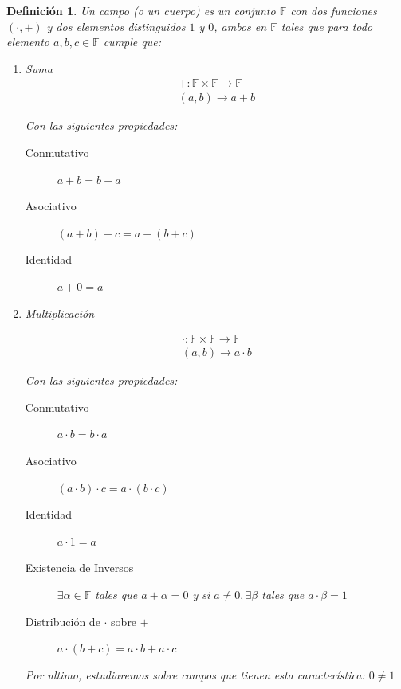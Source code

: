 \documentclass[10pt,a4paper]{article}
\newtheorem{mydef}{Definición}
\begin{document}
\begin{mydef} 
Un \textit{campo} (o un cuerpo) es un conjunto $ \mathbb{F} $ con dos funciones $ ( \cdot , + )$ y dos elementos distinguidos $ 1 $ y $ 0 $, ambos en $ \mathbb{F} $ tales que para todo elemento $a,b,c \in \mathbb{F}$ cumple que:

\begin{enumerate}
\item Suma
\begin{align*}
+:\mathbb{F} \times \mathbb{F} \longrightarrow \mathbb{F} \\
(a,b) \rightarrow a+b
\end{align*}

Con las siguientes propiedades:
\begin{description}

\item[Conmutativo] $a+b=b+a$
\item[Asociativo] $(a+b)+c=a+(b+c)$ 
\item [Identidad] $a+0=a$ 
\end{description}

\item Multiplicación

\begin{align*}
\cdot:\mathbb{F} \times \mathbb{F} \longrightarrow \mathbb{F} \\
(a,b) \rightarrow a \cdot b
\end{align*}

Con las siguientes propiedades:
\begin{description}
\item[Conmutativo] $a \cdot b = b \cdot a$
\item[Asociativo] $(a \cdot b) \cdot c = a \cdot (b \cdot c)$
\item [Identidad] $a \cdot 1 = a$
\item[Existencia de Inversos] $\exists \alpha \in \mathbb{F}$ tales que $a+\alpha=0$ y si $a \neq 0, \exists \beta$ tales que $a \cdot \beta = 1 $ 
\item[Distribución de $\cdot$ sobre $+$] $a \cdot (b+c) = a \cdot b + a \cdot c$
\end{description}

Por ultimo, estudiaremos sobre campos que tienen esta característica: $0 \neq 1 $


\end{enumerate}


\end{mydef}
\end{document}
